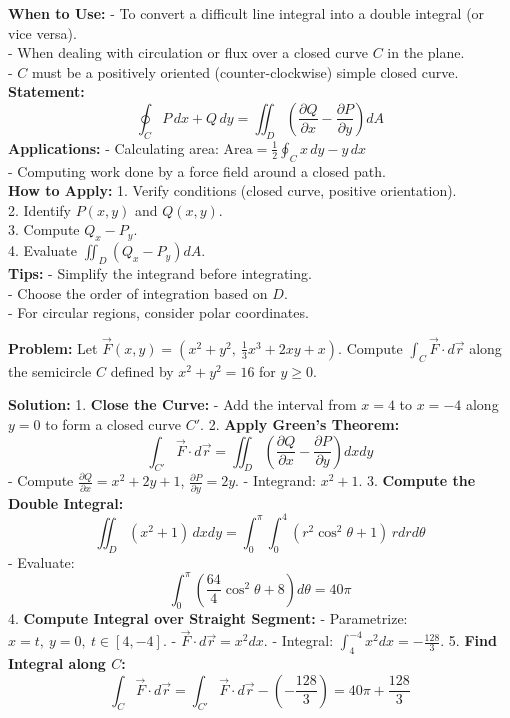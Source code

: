 \documentclass[9pt]{article}
\begin{document}
\begin{multicols}{2}
\begin{tcolorbox}[title=\textbf{Green's Theorem}, colframe=lightgreen]
\textbf{When to Use:}
- To convert a difficult line integral into a double integral (or vice versa). \\
- When dealing with circulation or flux over a closed curve \( C \) in the plane. \\
- \( C \) must be a positively oriented (counter-clockwise) simple closed curve. \\
\textbf{Statement:}
\[ \oint_C P\,dx + Q\,dy = \iint_D \left( \frac{\partial Q}{\partial x} - \frac{\partial P}{\partial y} \right) dA \]
\textbf{Applications:}
- Calculating area: \( \text{Area} = \frac{1}{2} \oint_C x\, dy - y\, dx \) \\
- Computing work done by a force field around a closed path. \\
\textbf{How to Apply:}
1. Verify conditions (closed curve, positive orientation). \\
2. Identify \( P(x, y) \) and \( Q(x, y) \). \\
3. Compute \( Q_x - P_y \). \\
4. Evaluate \( \iint_D (Q_x - P_y) dA \). \\
\textbf{Tips:}
- Simplify the integrand before integrating. \\
- Choose the order of integration based on \( D \). \\
- For circular regions, consider polar coordinates.
\end{tcolorbox}

\begin{tcolorbox}[title=\textbf{Example: Evaluating a Line Integral Using Green's Theorem}, colframe=lightpink]
\textbf{Problem:} Let \( \vec{F}(x, y) = \left( x^2 + y^2,\ \frac{1}{3} x^3 + 2xy + x \right) \). Compute \( \int_C \vec{F} \cdot d\vec{r} \) along the semicircle \( C \) defined by \( x^2 + y^2 = 16 \) for \( y \geq 0 \).

\textbf{Solution:}
1. \textbf{Close the Curve:}
   - Add the interval from \( x = 4 \) to \( x = -4 \) along \( y = 0 \) to form a closed curve \( C' \).
2. \textbf{Apply Green's Theorem:}
   \[ \int_{C'} \vec{F} \cdot d\vec{r} = \iint_D \left( \frac{\partial Q}{\partial x} - \frac{\partial P}{\partial y} \right) dx dy \]
   - Compute \( \frac{\partial Q}{\partial x} = x^2 + 2y + 1 \), \( \frac{\partial P}{\partial y} = 2y \).
   - Integrand: \( x^2 + 1 \).
3. \textbf{Compute the Double Integral:}
   \[ \iint_D (x^2 + 1)\, dx dy = \int_{0}^{\pi} \int_{0}^{4} (r^2 \cos^2 \theta + 1)\, r dr d\theta \]
   - Evaluate:
     \[ \int_{0}^{\pi} \left( \frac{64}{4} \cos^2 \theta + 8 \right) d\theta = 40\pi \]
4. \textbf{Compute Integral over Straight Segment:}
   - Parametrize: \( x = t,\ y = 0,\ t \in [4, -4] \).
   - \( \vec{F} \cdot d\vec{r} = x^2 dx \).
   - Integral: \( \int_{4}^{-4} x^2 dx = -\frac{128}{3} \).
5. \textbf{Find Integral along \( C \):}
   \[ \int_C \vec{F} \cdot d\vec{r} = \int_{C'} \vec{F} \cdot d\vec{r} - \left( -\frac{128}{3} \right) = 40\pi + \frac{128}{3} \]


\end{tcolorbox}
\end{multicols}
\end{document}
